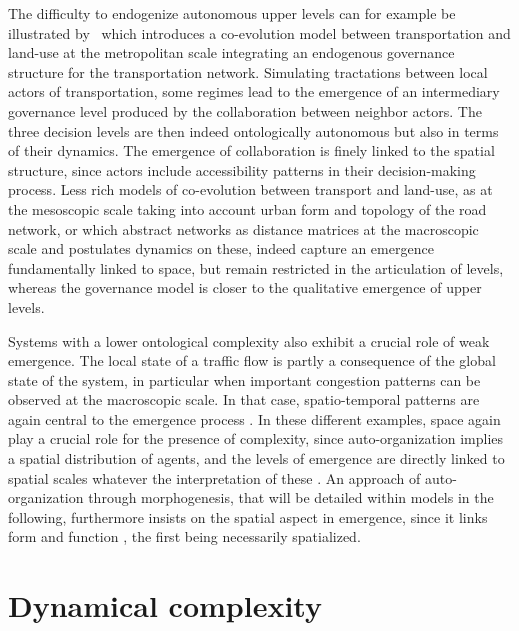 \documentclass[11pt]{article}
\begin{document}
The difficulty to endogenize autonomous upper levels can for example be illustrated by~\cite{lenechet:halshs-01272236} which introduces a co-evolution model between transportation and land-use at the metropolitan scale integrating an endogenous governance structure for the transportation network. Simulating tractations between local actors of transportation, some regimes lead to the emergence of an intermediary governance level produced by the collaboration between neighbor actors. The three decision levels are then indeed ontologically autonomous but also in terms of their dynamics. The emergence of collaboration is finely linked to the spatial structure, since actors include accessibility patterns in their decision-making process. Less rich models of co-evolution between transport and land-use, as \cite{raimbault2018urban} at the mesoscopic scale taking into account urban form and topology of the road network, or \cite{raimbault2018modeling} which abstract networks as distance matrices at the macroscopic scale and postulates dynamics on these, indeed capture an emergence fundamentally linked to space, but remain restricted in the articulation of levels, whereas the governance model is closer to the qualitative emergence of upper levels.


Systems with a lower ontological complexity also exhibit a crucial role of weak emergence. The local state of a traffic flow is partly a consequence of the global state of the system, in particular when important congestion patterns can be observed at the macroscopic scale. In that case, spatio-temporal patterns are again central to the emergence process \citep{treiber2010three}. In these different examples, space again play a crucial role for the presence of complexity, since auto-organization implies a spatial distribution of agents, and the levels of emergence are directly linked to spatial scales whatever the interpretation of these \citep{manson2008does}. An approach of auto-organization through morphogenesis, that will be detailed within models in the following, furthermore insists on the spatial aspect in emergence, since it links form and function \citep{doursat2012morphogenetic}, the first being necessarily spatialized.





\section{Dynamical complexity}
\end{document}
